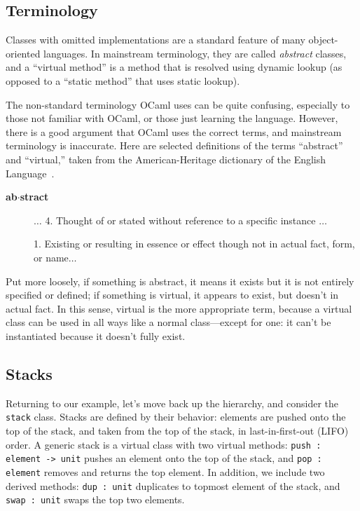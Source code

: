 \subsection{Terminology}

Classes with omitted implementations are a standard feature of many object-oriented languages.  In
mainstream terminology, they are called \emph{abstract} classes, and a ``virtual method'' is a
method that is resolved using dynamic lookup (as opposed to a ``static method'' that uses static lookup).

The non-standard terminology OCaml uses can be quite confusing, especially to those not familiar
with OCaml, or those just learning the language.  However, there is a good argument that OCaml uses
the correct terms, and mainstream terminology is inaccurate.  Here are selected definitions of the terms
``abstract'' and ``virtual,'' taken from the American-Heritage dictionary of the English
Language~\cite{american-heritage-2000}.

\begin{description}
\item[\textbf{ab$\cdot$stract}]

$\ldots$ 4.{} Thought of or stated without reference to a specific instance $\ldots$

\item[]

1.{} Existing or resulting in essence or effect though not in actual fact, form, or name$\ldots$
\end{description}
%
Put more loosely, if something is abstract, it means it exists but it is not entirely specified or
defined; if something is virtual, it appears to exist, but doesn't in actual fact.  In this sense,
virtual is the more appropriate term, because a virtual class can be used in all ways like a normal
class---except for one: it can't be instantiated because it doesn't fully exist.

\subsection{Stacks}

Returning to our example, let's move back up the hierarchy, and consider the \hbox{\lstinline/stack/}
class.  Stacks are defined by their behavior: elements are pushed onto the top of the stack, and
taken from the top of the stack, in last-in-first-out (LIFO) order.  A generic stack is a virtual
class with two virtual methods: \hbox{\lstinline/push : element -> unit/} pushes an element onto the top of
the stack, and \hbox{\lstinline/pop : element/} removes and returns the top element.  In addition, we
include two derived methods: \hbox{\lstinline/dup : unit/} duplicates to topmost element of the stack,
and \hbox{\lstinline/swap : unit/} swaps the top two elements.

